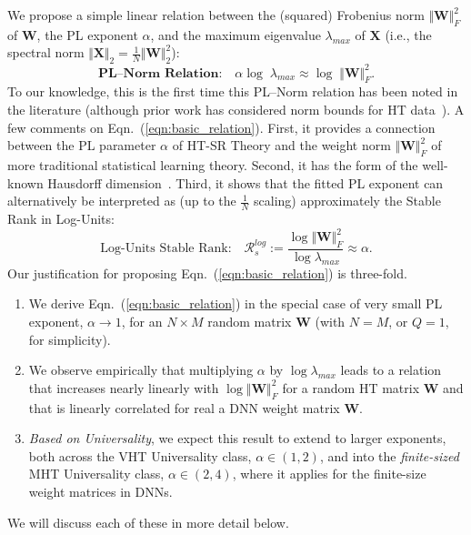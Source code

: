 We propose a simple linear relation between the (squared) Frobenius norm $\Vert\mathbf{W}\Vert^{2}_{F}$ of $\mathbf{W}$, the PL exponent $\alpha$, and the maximum eigenvalue $\lambda_{max}$ of $\mathbf{X}$ (i.e., the spectral norm $\Vert\mathbf{X}\Vert_{2}=\frac{1}{N}\Vert\mathbf{W}\Vert^{2}_{2}$):  
\begin{equation}
\textbf{PL--Norm Relation:} \quad \alpha\log\;\lambda_{max}\approx\log\;\Vert\mathbf{W}\Vert^{2}_{F}  .
\label{eqn:basic_relation}
\end{equation}
To our knowledge, this is the first time this PL--Norm relation has been noted in the literature (although prior work has considered norm bounds for HT data~\cite{MN09_TR}).
A few comments on Eqn.~(\ref{eqn:basic_relation}).
First, it provides a connection between the PL parameter $\alpha$ of HT-SR Theory and the weight norm $\Vert\mathbf{W}\Vert^{2}_{F}$ of more traditional statistical learning theory.
Second, it has the form of the well-known Hausdorff dimension~\cite{Sch07}.
Third, it shows that the fitted PL exponent can alternatively be interpreted as (up to the $\frac{1}{N}$ scaling) approximately the Stable Rank in Log-Units:
$$
\mbox{Log-Units Stable Rank:} 
\quad
\mathcal{R}^{log}_{s}:=\dfrac{\log\Vert\mathbf{W}\Vert^{2}_{F}}{\log\lambda_{max}}  \approx \alpha  .
$$
Our justification for proposing Eqn.~(\ref{eqn:basic_relation}) is three-fold.
\begin{enumerate}
\item
\label{enum:first}
We derive Eqn.~(\ref{eqn:basic_relation}) in the special case of very small PL exponent, $\alpha \rightarrow 1$, for an $N\times M$ random matrix $\mathbf{W}$ (with $N=M$, or $Q=1$, for simplicity).
\item
\label{enum:second}
We observe empirically that multiplying $\alpha$ by $\log\lambda_{max}$ leads to a relation that increases nearly linearly with $\log\Vert\mathbf{W}\Vert^{2}_{F}$ for a random HT matrix $\mathbf{W}$ and that is linearly correlated for real a DNN weight matrix $\mathbf{W}$. 
\item
\label{enum:third}
\emph{Based on Universality}, we expect this result to extend to larger exponents, both across the VHT Universality class, $\alpha\in(1,2)$, and into the \emph{finite-sized} MHT Universality class, $\alpha\in(2,4)$, where it applies for the finite-size weight matrices in DNNs.
\end{enumerate}
We will discuss each of these in more detail below.

